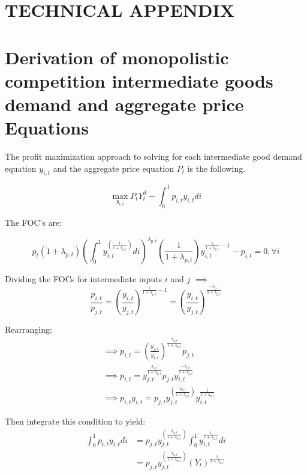 \documentclass[article,11pt,letterpaper,fleqn]{article}
\theoremstyle{definition}
\numberwithin{equation}{section}
\begin{document}
{\section*{TECHNICAL APPENDIX}                    %

\setcounter{equation}{0} %
\section{Derivation of monopolistic competition intermediate goods demand and aggregate price Equations}\label{TAppDemPrice}

The profit maximization approach to solving for each intermediate good demand equation $y_{i,t}$ and the aggregate price equation $P_t$ is the following.

\begin{equation}
\max_{y_{i,t}} P_{t}Y_{t}^{d} - \int_{0}^{1}p_{i,t}y_{i,t}di
\end{equation}

The FOC's are:

\begin{equation}
p_{t}(1+\lambda_{p,t})\left(\int_{0}^{1}y_{i,t}^{\left(\frac{1}{1+\lambda_{p,t}}\right)}di\right)^{\lambda_{p,t}}\left(\frac{1}{1+\lambda_{p,t}}\right)y_{i,t}^{\frac{1}{1+\lambda_{p,t}}-1}-p_{i,t} = 0, \forall i
\end{equation}

Dividing the FOCs for intermediate inputs $i$ and $j$ $\implies$
\begin{equation}
\frac{p_{i,t}}{p_{j,t}} = \left(\frac{y_{i,t}}{y_{j,t}}\right)^{\frac{1}{1+\lambda_{p,t}}-1} = \left(\frac{y_{i,t}}{y_{j,t}}\right)^{\frac{-\lambda_{p,t}}{1+\lambda_{p,t}}}
\end{equation}

Rearranging:
\begin{equation}
\begin{split}
&\implies p_{i,t} = \left(\frac{y_{j,t}}{y_{i,t}}\right)^{\frac{\lambda_{p,t}}{1+\lambda_{p,t}}}p_{j,t} \\
& \implies p_{i,t} = y_{j,t}^{\frac{\lambda_{p,t}}{1+\lambda_{p,t}}}p_{j,t}y_{i,t}^{\frac{-\lambda_{p,t}}{1+\lambda_{p,t}}} \\
& \implies p_{i,t}y_{i,t} = p_{j,t}y_{j,t}^{\left(\frac{\lambda_{p,t}}{1+\lambda_{p,t}}\right)}y_{i,t}^{\frac{1}{1+\lambda_{p,t}}}
\end{split}
\end{equation}

Then integrate this condition to yield:
\begin{equation}
\begin{split}
\int_{0}^{1}p_{i,t}y_{i,t}di & = p_{j,t}y_{j,t}^{\left(\frac{\lambda_{p,t}}{1+\lambda_{p,t}}\right)}\int_{0}^{1}y_{i,t}^{\frac{1}{1+\lambda_{p,t}}}di  \\
& = p_{j,t}y_{j,t}^{\left(\frac{\lambda_{p,t}}{1+\lambda_{p,t}}\right)}(Y_{t})^{\frac{1}{1+\lambda_{p,t}}}
\end{split}
\end{equation}

}
\end{document}

